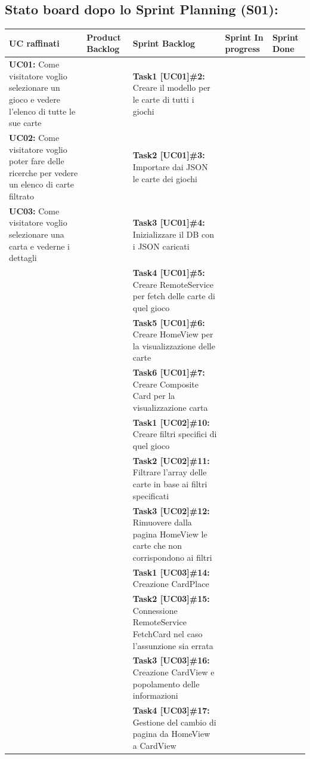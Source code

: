 \documentclass[a4paper, oneside]{article}
\begin{document}
\begin{landscape}
        \subsection{Stato board dopo lo Sprint Planning (S01):}
        \small
        \def\arraystretch{2}%
        \begin{tabular}{ | p{6.5cm} | p{3.5cm} | p{8cm} | p{2.4cm} | p{2.4cm}| }
            \hline
            \textbf{UC raffinati}
            & \textbf{Product Backlog}
            & \textbf{Sprint Backlog}
            & \textbf{Sprint In progress}
            & \textbf{Sprint Done} \\
            \hline
            \textbf{UC01:} Come visitatore voglio selezionare un gioco e vedere l'elenco di tutte le sue carte
            &  & \textbf{Task1 [UC01]\#2:} Creare il modello per le carte di tutti i giochi & & \\
            \hline
            \textbf{UC02:} Come visitatore voglio poter fare delle ricerche per vedere un elenco di carte filtrato
            &  & \textbf{Task2 [UC01]\#3:} Importare dai JSON le carte dei giochi & & \\
            \hline
            \textbf{UC03:} Come visitatore voglio selezionare una carta e vederne i dettagli
            & & \textbf{Task3 [UC01]\#4:} Inizializzare il DB con i JSON caricati & & \\
            \hline
            & & \textbf{Task4 [UC01]\#5:} Creare RemoteService per fetch delle carte di quel gioco & & \\
            \hline
            & & \textbf{Task5 [UC01]\#6:} Creare HomeView per la visualizzazione delle carte & & \\
            \hline
            & & \textbf{Task6 [UC01]\#7:} Creare Composite Card per la visualizzazione carta & & \\
            \hline
            & & \textbf{Task1 [UC02]\#10:} Creare filtri specifici di quel gioco & & \\
            \hline
            & & \textbf{Task2 [UC02]\#11:} Filtrare l'array delle carte in base ai filtri specificati & & \\
            \hline
            & & \textbf{Task3 [UC02]\#12:} Rimuovere dalla pagina HomeView le carte che non corrispondono ai filtri & & \\
            \hline
            & & \textbf{Task1 [UC03]\#14:} Creazione CardPlace & & \\
            \hline
            & & \textbf{Task2 [UC03]\#15:} Connessione RemoteService FetchCard nel caso l'assunzione sia errata & & \\
            \hline
            & & \textbf{Task3 [UC03]\#16:} Creazione CardView e popolamento delle informazioni & & \\
            \hline
            & & \textbf{Task4 [UC03]\#17:} Gestione del cambio di pagina da HomeView a CardView & & \\
            \hline
        \end{tabular}


\end{landscape}
\end{document}

